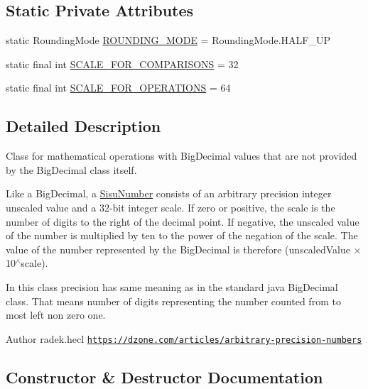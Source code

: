\subsection*{Static Private Attributes}
\begin{DoxyCompactItemize}
\item 
static Rounding\+Mode \hyperlink{classcom_1_1aarrelaakso_1_1drawl_1_1_sisu_number_a98077c422e928740febf571e3f2ec6b5}{R\+O\+U\+N\+D\+I\+N\+G\+\_\+\+M\+O\+DE} = Rounding\+Mode.\+H\+A\+L\+F\+\_\+\+UP
\item 
static final int \hyperlink{classcom_1_1aarrelaakso_1_1drawl_1_1_sisu_number_a4630f8f5414673cb5021dc7d194dc257}{S\+C\+A\+L\+E\+\_\+\+F\+O\+R\+\_\+\+C\+O\+M\+P\+A\+R\+I\+S\+O\+NS} = 32
\item 
static final int \hyperlink{classcom_1_1aarrelaakso_1_1drawl_1_1_sisu_number_a0ab71e0c4e4143159d9341c562d131af}{S\+C\+A\+L\+E\+\_\+\+F\+O\+R\+\_\+\+O\+P\+E\+R\+A\+T\+I\+O\+NS} = 64
\end{DoxyCompactItemize}


\subsection{Detailed Description}
Class for mathematical operations with Big\+Decimal values that are not provided by the Big\+Decimal class itself. 

Like a Big\+Decimal, a \hyperlink{classcom_1_1aarrelaakso_1_1drawl_1_1_sisu_number}{Sisu\+Number} consists of an arbitrary precision integer unscaled value and a 32-\/bit integer scale. If zero or positive, the scale is the number of digits to the right of the decimal point. If negative, the unscaled value of the number is multiplied by ten to the power of the negation of the scale. The value of the number represented by the Big\+Decimal is therefore (unscaled\+Value × 10$^\wedge$scale). 

In this class precision has same meaning as in the standard java Big\+Decimal class. That means number of digits representing the number counted from to most left non zero one.

\begin{DoxyAuthor}{Author}
radek.\+hecl  \href{https://dzone.com/articles/arbitrary-precision-numbers}{\tt https\+://dzone.\+com/articles/arbitrary-\/precision-\/numbers} 
\end{DoxyAuthor}


\subsection{Constructor \& Destructor Documentation}
\mbox{\label{classcom_1_1aarrelaakso_1_1drawl_1_1_sisu_number_a3e7b40170c4ae69461b94208a0f82f5e}} 
